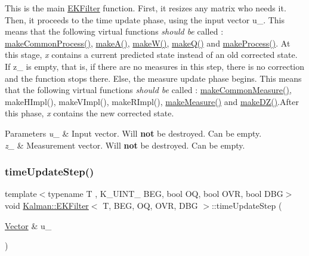 This is the main {\ttfamily \mbox{\hyperlink{classKalman_1_1EKFilter}{E\+K\+Filter}}} function. First, it resizes any matrix who needs it. Then, it proceeds to the time update phase, using the input vector {\ttfamily u\+\_\+}. This means that the following virtual functions {\itshape should be} called \+: {\ttfamily \mbox{\hyperlink{classKalman_1_1EKFilter_aace6f213340e7a0c78541454b13e8586}{make\+Common\+Process()}}}, {\ttfamily \mbox{\hyperlink{classKalman_1_1EKFilter_aa2cd9e16f121fe26802a133b4cb37f59}{make\+A()}}}, {\ttfamily \mbox{\hyperlink{classKalman_1_1EKFilter_ac0ea9285a523d219835f7ca2ce932902}{make\+W()}}}, {\ttfamily \mbox{\hyperlink{classKalman_1_1EKFilter_ab9765c4cbe0f67a1aa82ddfbc8173877}{make\+Q()}}} and {\ttfamily \mbox{\hyperlink{classKalman_1_1EKFilter_a778232d397d981c08b3ca23ea800aa6a}{make\+Process()}}}. At this stage, {\itshape x} contains a current predicted state instead of an old corrected state. If {\ttfamily z\+\_\+} is empty, that is, if there are no measures in this step, there is no correction and the function stops there. Else, the measure update phase begins. This means that the following virtual functions {\itshape should be} called \+: {\ttfamily \mbox{\hyperlink{classKalman_1_1EKFilter_a89337cacd8115338ffd34637f0ecbd92}{make\+Common\+Measure()}}}, {\ttfamily make\+H\+Impl()}, {\ttfamily make\+V\+Impl()}, {\ttfamily make\+R\+Impl()}, {\ttfamily \mbox{\hyperlink{classKalman_1_1EKFilter_aac9f6d80e5ec9e6ea2ccf045cb682df8}{make\+Measure()}}} and {\ttfamily \mbox{\hyperlink{classKalman_1_1EKFilter_a54a168299879f6b3023b0a42b1afe29d}{make\+D\+Z()}}}.After this phase, {\itshape x} contains the new corrected state. 
\begin{DoxyParams}{Parameters}
{\em u\+\_\+} & Input vector. Will {\bfseries not} be destroyed. Can be empty. \\
\hline
{\em z\+\_\+} & Measurement vector. Will {\bfseries not} be destroyed. Can be empty. \\
\hline
\end{DoxyParams}
\mbox{\label{classKalman_1_1EKFilter_a715d9c634db18e24579673f426750e36}} 
\subsubsection{\texorpdfstring{time\+Update\+Step()}{timeUpdateStep()}}
{\footnotesize\ttfamily template$<$typename T , K\+\_\+\+U\+I\+N\+T\+\_ B\+EG, bool OQ, bool O\+VR, bool D\+BG$>$ \\
void \mbox{\hyperlink{classKalman_1_1EKFilter}{Kalman\+::\+E\+K\+Filter}}$<$ T, B\+EG, OQ, O\+VR, D\+BG $>$\+::time\+Update\+Step (\begin{DoxyParamCaption}\item[{\mbox{\hyperlink{classKalman_1_1EKFilter_af773d1217ecb01925b857d49b32bc636}{Vector}} \&}]{u\+\_\+ }\end{DoxyParamCaption})}



